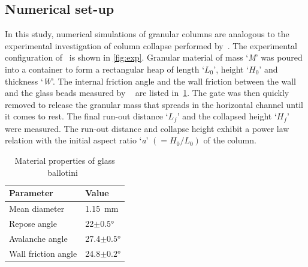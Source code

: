 \subsection{Numerical set-up}

In this study, numerical simulations of granular columns are analogous to the  
experimental investigation of column collapse performed
by~\citet{Lajeunesse2004}. The experimental configuration 
of~\citet{Lajeunesse2004} is shown in \cref{fig:exp}. Granular material of mass 
`\textit{M}' was poured into a container to form a rectangular heap of length 
`${L}_{\textit{0}}$', height `${H}_{\textit{0}}$' and thickness `\textit{W}'. 
The internal friction angle and the wall friction between the wall and the 
glass beads measured by ~\citet{Lajeunesse2004} are listed 
in~\cref{table:mat_prop}. The gate was then quickly removed to 
release the granular mass that spreads in the horizontal channel until it comes 
to rest. The final run-out distance `${L}_{\textit{f}}$' and the collapsed 
height `$H_{\textit{f}}$' were measured. The run-out distance and collapse 
height exhibit a power law relation with the initial aspect ratio 
`\textit{a}' $(=H_{\textit{0}}/L_{\textit{0}})$ of the column. 

\begin{table}[tbhp]
\caption{Material properties of glass ballotini~\citep{Lajeunesse2004}}
\label{table:mat_prop}
\centering
\begin{tabular}{ll}
\toprule
\textbf{Parameter} & \textbf{Value} \\ \midrule
Mean diameter & 1.15~\si{\mm} \\
Repose angle & 22$\pm 0.5$\si{\degree} \\
Avalanche angle & 27.4$\pm 0.5$\si{\degree} \\
Wall friction angle & 24.8$\pm 0.2$\si{\degree}\\
\bottomrule
\end{tabular}
\end{table}


